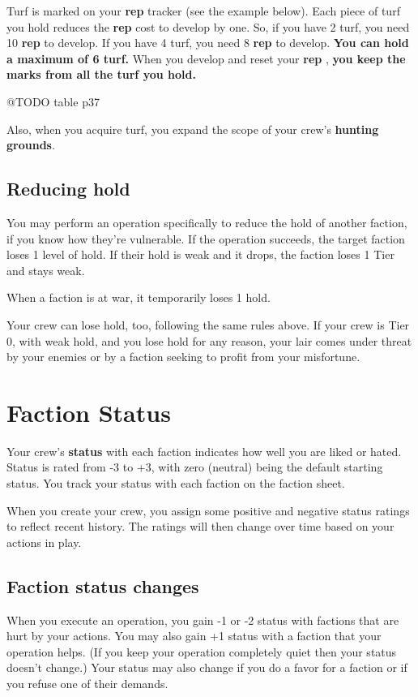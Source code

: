 \documentclass[11pt,fleqn,a5paper]{book}
\newcommand{\gameterm}[1]{\textbf{#1}}
\begin{document}
Turf is marked on your \gameterm{rep}  tracker (see the example below). Each piece of turf you hold reduces the \gameterm{rep}  cost to develop by one. So, if you have 2 turf, you need 10 \gameterm{rep}  to develop. If you have 4 turf, you need 8 \gameterm{rep}  to develop. \textbf{You can hold a maximum of 6 turf.} When you develop and reset your \gameterm{rep} , \textbf{you keep the marks from all the turf you hold.}

@TODO table p37

Also, when you acquire turf, you expand the scope of your crew’s \textbf{hunting grounds}.

\subsection{Reducing hold}

You may perform an operation specifically to reduce the hold of another faction, if you know how they’re vulnerable. If the operation succeeds, the target faction loses 1 level of hold. If their hold is weak and it drops, the faction loses 1 Tier and stays weak.

When a faction is at war, it temporarily loses 1 hold.

Your crew can lose hold, too, following the same rules above. If your crew is Tier 0, with weak hold, and you lose hold for any reason, your lair comes under threat by your enemies or by a faction seeking to profit from your misfortune.

\section{Faction Status}

Your crew’s \textbf{status} with each faction indicates how well you are liked or hated. Status is rated from -3 to +3, with zero (neutral) being the default starting status. You track your status with each faction on the faction sheet.

When you create your crew, you assign some positive and negative status ratings to reflect recent history. The ratings will then change over time based on your actions in play.

\subsection{Faction status changes}

When you execute an operation, you gain -1 or -2 status with factions that are hurt by your actions. You may also gain +1 status with a faction that your operation helps. (If you keep your operation completely quiet then your status doesn’t change.) Your status may also change if you do a favor for a faction or if you refuse one of their demands.
\end{document}
